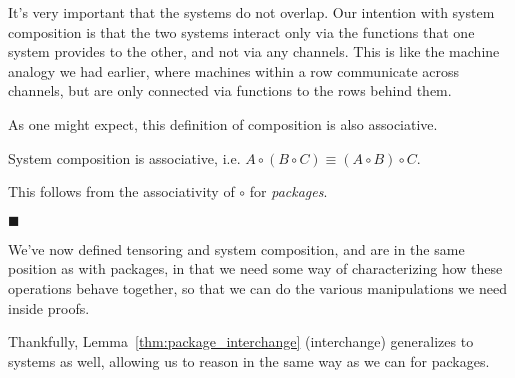 It's very important that the systems do not overlap.
Our intention with system composition is that the two systems
interact only via the functions that one system provides to the other,
and not via any channels.
This is like the machine analogy we had earlier,
where machines within a row communicate across channels,
but are only connected via functions to the rows behind them.

As one might expect, this definition of composition is also associative. 

\begin{lemma}
System composition is associative, i.e. $A \circ (B \circ C) \equiv (A \circ B) \circ C$.

 This follows from the associativity of $\circ$ for \emph{packages}.

$\blacksquare$
\end{lemma}

We've now defined tensoring and system composition,
and are in the same position as with packages, in that we need
some way of characterizing how these operations behave together,
so that we can do the various manipulations we need inside proofs.

Thankfully, Lemma~\ref{thm:package_interchange} (interchange) generalizes
to systems as well, allowing us to reason in the same way
as we can for packages.

